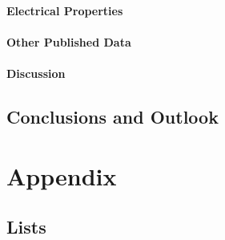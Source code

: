 \documentclass  [
  paper    = a4,
  BCOR     = 10mm,
  twoside,
  fontsize = 12pt,
  fleqn,
  toc      = bibnumbered,
  toc      = listofnumbered,
  numbers  = noendperiod,
  headings = normal,
  listof   = leveldown,
  version  = 3.03
]                                       {scrreprt}
\begin{document}
		\subsection{Electrical Properties}
		\subsection{Other Published Data}
		\subsection{Discussion}
  \newpage
  \chapter{Conclusions and Outlook}\label{cha:conclusions}





  \part{Appendix}
  \begin{appendix}
  
    \chapter{Lists}
    \listoffigures
    \listoftables
      
    
    
    
    
  \end{appendix}
  
\end{document}
